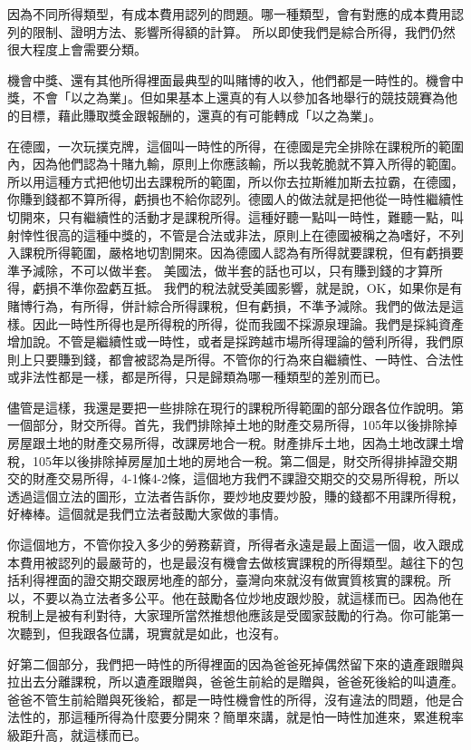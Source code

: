 \documentclass[]{ctexbook}
\begin{document}
因為不同所得類型，有成本費用認列的問題。哪一種類型，會有對應的成本費用認列的限制、證明方法、影響所得額的計算。
所以即使我們是綜合所得，我們仍然很大程度上會需要分類。

機會中獎、還有其他所得裡面最典型的叫賭博的收入，他們都是一時性的。機會中獎，不會「以之為業」。但如果基本上還真的有人以參加各地舉行的競技競賽為他的目標，藉此賺取獎金跟報酬的，還真的有可能轉成「以之為業」。

在德國，一次玩撲克牌，這個叫一時性的所得，在德國是完全排除在課稅所的範圍內，因為他們認為十賭九輸，原則上你應該輸，所以我乾脆就不算入所得的範圍。所以用這種方式把他切出去課稅所的範圍，所以你去拉斯維加斯去拉霸，在德國，你賺到錢都不算所得，虧損也不給你認列。德國人的做法就是把他從一時性繼續性切開來，只有繼續性的活動才是課稅所得。這種好聽一點叫一時性，難聽一點，叫射悻性很高的這種中獎的，不管是合法或非法，原則上在德國被稱之為嗜好，不列入課稅所得範圍，嚴格地切割開來。因為德國人認為有所得就要課稅，但有虧損要準予減除，不可以做半套。
美國法，做半套的話也可以，只有賺到錢的才算所得，虧損不準你盈虧互抵。
我們的稅法就受美國影響，就是說，OK，如果你是有賭博行為，有所得，併計綜合所得課稅，但有虧損，不準予減除。我們的做法是這樣。因此一時性所得也是所得稅的所得，從而我國不採源泉理論。我們是採純資產增加說。不管是繼續性或一時性，或者是採跨越市場所得理論的營利所得，我們原則上只要賺到錢，都會被認為是所得。不管你的行為來自繼續性、一時性、合法性或非法性都是一樣，都是所得，只是歸類為哪一種類型的差別而已。

儘管是這樣，我還是要把一些排除在現行的課稅所得範圍的部分跟各位作說明。第一個部分，財交所得。首先，我們排除掉土地的財產交易所得，105年以後排除掉房屋跟土地的財產交易所得，改課房地合一稅。財產排斥土地，因為土地改課土增稅，105年以後排除掉房屋加土地的房地合一稅。第二個是，財交所得排掉證交期交的財產交易所得，4-1條4-2條，這個地方我們不課證交期交的交易所得稅，所以透過這個立法的圖形，立法者告訴你，要炒地皮要炒股，賺的錢都不用課所得稅，好棒棒。這個就是我們立法者鼓勵大家做的事情。

你這個地方，不管你投入多少的勞務薪資，所得者永遠是最上面這一個，收入跟成本費用被認列的最嚴苛的，也是最沒有機會去做核實課稅的所得類型。越往下的包括利得裡面的證交期交跟房地產的部分，臺灣向來就沒有做實質核實的課稅。所以，不要以為立法者多公平。他在鼓勵各位炒地皮跟炒股，就這樣而已。因為他在稅制上是被有利對待，大家理所當然推想他應該是受國家鼓勵的行為。你可能第一次聽到，但我跟各位講，現實就是如此，也沒有。

好第二個部分，我們把一時性的所得裡面的因為爸爸死掉偶然留下來的遺產跟贈與拉出去分離課稅，所以遺產跟贈與，爸爸生前給的是贈與，爸爸死後給的叫遺產。爸爸不管生前給贈與死後給，都是一時性機會性的所得，沒有違法的問題，他是合法性的，那這種所得為什麼要分開來？簡單來講，就是怕一時性加進來，累進稅率級距升高，就這樣而已。
\end{document}

